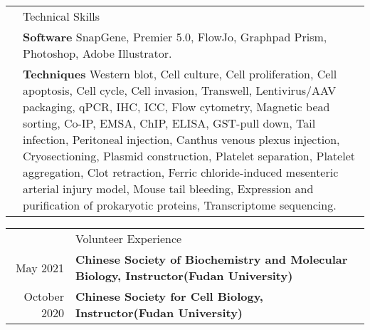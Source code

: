 \documentclass[letterpaper, 11pt]{article}
\newcommand{\headingfont}{\Large\color{LimeGreen}}
\newenvironment{SectionTable}[1]{
	\renewcommand*{\arraystretch}{1.7}
	\setlength{\tabcolsep}{10pt}
	\begin{longtable}{Rp{5.2in}} & #1 \\}
{\end{longtable}\vspace{-.3cm}}
\begin{document}
\begin{SectionTable}{\headingfont Technical Skills}

& \textbf{Software} \newline
SnapGene, Premier 5.0, FlowJo, Graphpad Prism, Photoshop, Adobe Illustrator.\\

& \textbf{Techniques} \newline
Western blot, Cell culture, Cell proliferation, Cell apoptosis, Cell cycle, Cell invasion, Transwell, Lentivirus/AAV packaging, qPCR, IHC, ICC, Flow cytometry, Magnetic bead sorting, Co-IP, EMSA, ChIP, ELISA, GST-pull down, Tail infection, Peritoneal injection, Canthus venous plexus injection, Cryosectioning, Plasmid construction, Platelet separation, Platelet aggregation, Clot retraction, Ferric chloride-induced mesenteric arterial injury model, Mouse tail bleeding, Expression and purification of prokaryotic proteins, Transcriptome sequencing. \\
\end{SectionTable}


\begin{SectionTable}{\headingfont Volunteer Experience}
May 2021 & 
\textbf{Chinese Society of Biochemistry and Molecular Biology, Instructor(Fudan University)} \\

October 2020 & 
\textbf{Chinese Society for Cell Biology, Instructor(Fudan University)}
\end{SectionTable}
	
\end{document}
